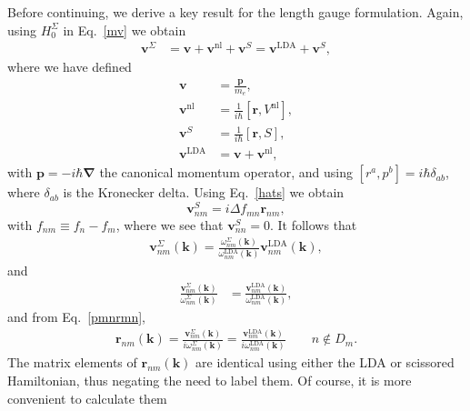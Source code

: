 \documentclass[floatfix,prb,aps,superscriptaddress,showpacs,11pt,preprint,letterpaper]{revtex4}
\begin{document}
Before continuing,
we derive a key result for the length gauge formulation. 
Again, using $H^\Sigma_0$ in
Eq.~\eqref{mv} we obtain
\begin{align}\label{vop2}
\mathbf{v}^\Sigma&=
\mathbf{v} 
+
\mathbf{v}^\mathrm{nl} 
+\mathbf{v}^S
=
\mathbf{v}^\mathrm{LDA} 
+\mathbf{v}^S 
,
\end{align}
where we have defined 
\begin{subequations}
\begin{align}\label{ve}
\mathbf{v} 
&=\frac{\mathbf{p}}{m_e},
\\\label{vnl}
\mathbf{v}^\mathrm{nl} 
&=
\frac{1}{i\hbar}[\mathbf{r},V^\mathrm{nl}],
\\\label{vs}
\mathbf{v}^S
&=
\frac{1}{i\hbar}[\mathbf{r}, S],
\\\label{vlda}
\mathbf{v}^\mathrm{LDA} 
&=
\mathbf{v} 
+\mathbf{v}^\mathrm{nl}
,
\end{align}  
\end{subequations}
with $\mathbf{p}=-i\hbar\boldsymbol{\nabla}$ the canonical momentum operator, 
and using $[r^a,p^b]=i\hbar\delta_{ab}$, where $\delta_{ab}$ is the Kronecker delta.
Using Eq.~\eqref{hats} we obtain 
\begin{equation}\label{chon.2} 
\mathbf{v}^S_{nm}=i\Delta f_{mn}\mathbf{r}_{nm},
\end{equation}
with $f_{nm}\equiv f_n-f_m$,
where we see that $\mathbf{v}^S_{nn}=0$. It follows that
\begin{align}\label{chon.9}
\mathbf{v}^\Sigma_{nm}(\mathbf{k}) 
=\frac{\omega^\Sigma_{nm}(\mathbf{k})}{\omega^\mathrm{LDA}_{nm}(\mathbf{k})}
\mathbf{v}^\mathrm{LDA}_{nm}(\mathbf{k}) 
,
\end{align}
and
 \begin{align}\label{chon.8}
\frac{\mathbf{v}^\Sigma_{nm}(\mathbf{k})}{\omega^\Sigma_{nm}(\mathbf{k})}
&=
\frac{\mathbf{v}^\mathrm{LDA}_{nm}(\mathbf{k})}{\omega^\mathrm{LDA}_{nm}(\mathbf{k})}
,
\end{align}
and from Eq.~\eqref{pmnrmn},
\begin{align}\label{chon.10}
\mathbf{r}_{nm}(\mathbf{k}) 
=
\frac{\mathbf{v}^\Sigma_{nm}(\mathbf{k})}{i\omega^\Sigma_{nm}(\mathbf{k})}
=
\frac{\mathbf{v}^\mathrm{LDA}_{nm}(\mathbf{k})}{i\omega^\mathrm{LDA}_{nm}(\mathbf{k})}
\quad\quad n\notin D_m 
. 
\end{align}
The matrix elements 
of $\mathbf{r}_{nm}(\mathbf{k})$ are identical using either
the LDA or scissored
Hamiltonian, thus negating the need to label them.
Of course, it is more convenient to calculate them
\end{document}
